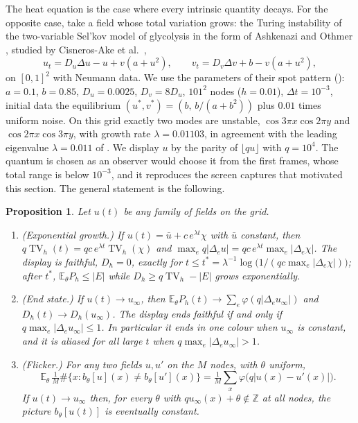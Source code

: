\documentclass[11pt,a4paper]{article}
\newtheorem{proposition}[theorem]{Proposition}
\theoremstyle{definition}
\theoremstyle{remark}
\newcommand{\Z}{\mathbb{Z}}
\newcommand{\E}{\mathbb{E}}
\newcommand{\TV}{\operatorname{TV}}
\begin{document}
The heat equation is the case where every intrinsic quantity decays.
For the opposite case, take a field whose total variation grows: the
Turing instability \cite{Turing} of the two-variable Sel'kov model of glycolysis in
the form of Ashkenazi and Othmer \cite{AshkenaziOthmer}, studied by
Cisneros-Ake et al.\ \cite{Glyco},
\begin{equation}\label{eq:selkov}
  u_t=D_u\Delta u-u+v(a+u^2),\qquad v_t=D_v\Delta v+b-v(a+u^2),
\end{equation}
on $[0,1]^2$ with Neumann data. We use the parameters of their spot
pattern (\cite[Fig.~4]{Glyco}): $a=0.1$, $b=0.85$, $D_u=0.0025$,
$D_v=8D_u$, $101^2$ nodes ($h=0.01$), $\Delta t=10^{-3}$, initial data
the equilibrium $(u^\ast,v^\ast)=(b,\,b/(a+b^2))$ plus $0.01$ times uniform
noise. On this grid exactly two modes are unstable,
$\cos3\pi x\cos2\pi y$ and $\cos2\pi x\cos3\pi y$, with growth rate
$\lambda=0.01103$, in agreement with the leading eigenvalue
$\lambda=0.011$ of \cite[Fig.~6]{Glyco}. We display $u$ by the parity of
$\lfloor qu\rfloor$ with $q=10^4$. The quantum is chosen as an observer
would choose it from the first frames, whose total range is below
$10^{-3}$, and it reproduces the screen captures that motivated this
section. The general statement is the following.

\begin{proposition}\label{prop:growth}
Let $u(t)$ be any family of fields on the grid.
\begin{enumerate}
\item (Exponential growth.) If $u(t)=\bar u+c\,e^{\lambda t}\chi$ with
$\bar u$ constant, then $q\TV_h(t)=qc\,e^{\lambda t}\TV_h(\chi)$ and
$\max_eq|\Delta_eu|=qc\,e^{\lambda t}\max_e|\Delta_e\chi|$. The display
is faithful, $D_h=0$, exactly for
$t\le t^\ast=\lambda^{-1}\log\bigl(1/(qc\max_e|\Delta_e\chi|)\bigr)$;
after $t^\ast$, $\E_\theta P_h\le|E|$ while $D_h\ge q\TV_h-|E|$ grows
exponentially.
\item (End state.) If $u(t)\to u_\infty$, then
$\E_\theta P_h(t)\to\sum_e\varphi(q|\Delta_eu_\infty|)$ and
$D_h(t)\to D_h(u_\infty)$. The display ends faithful if and only if
$q\max_e|\Delta_eu_\infty|\le1$. In particular it ends in one colour when
$u_\infty$ is constant, and it is aliased for all large $t$ when
$q\max_e|\Delta_eu_\infty|>1$.
\item (Flicker.) For any two fields $u,u'$ on the $M$ nodes, with $\theta$
uniform,
\begin{equation}\label{eq:flicker}
  \E_\theta\,\tfrac1M\#\{x:b_\theta[u](x)\ne b_\theta[u'](x)\}
  =\tfrac1M\textstyle\sum_x\varphi\bigl(q|u(x)-u'(x)|\bigr).
\end{equation}
If $u(t)\to u_\infty$ then, for every $\theta$ with
$qu_\infty(x)+\theta\notin\Z$ at all nodes, the picture $b_\theta[u(t)]$ is
eventually constant.
\end{enumerate}
\end{proposition}
\end{document}
